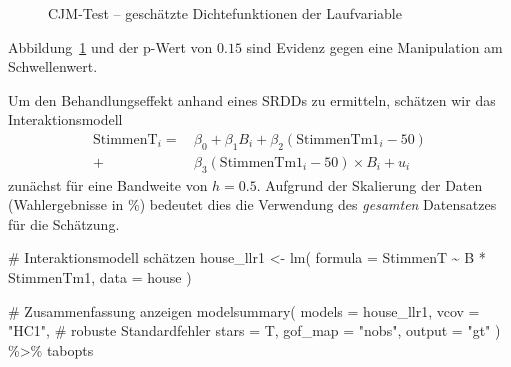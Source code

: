\documentclass[
  a4paper,
  DIV=11,
  oneside]{scrreprt}
\newenvironment{Shaded}{\begin{snugshade}}{\end{snugshade}}
\newcommand{\AttributeTok}[1]{\textcolor[rgb]{0.40,0.45,0.13}{#1}}
\newcommand{\CommentTok}[1]{\textcolor[rgb]{0.37,0.37,0.37}{#1}}
\newcommand{\FunctionTok}[1]{\textcolor[rgb]{0.28,0.35,0.67}{#1}}
\newcommand{\NormalTok}[1]{\textcolor[rgb]{0.00,0.23,0.31}{#1}}
\newcommand{\OtherTok}[1]{\textcolor[rgb]{0.00,0.23,0.31}{#1}}
\newcommand{\SpecialCharTok}[1]{\textcolor[rgb]{0.37,0.37,0.37}{#1}}
\newcommand{\StringTok}[1]{\textcolor[rgb]{0.13,0.47,0.30}{#1}}
\begin{document}
\begin{figure}[t]


\caption{\label{fig-cjm-lee}CJM-Test -- geschätzte Dichtefunktionen der
Laufvariable}

\end{figure}%

Abbildung~\ref{fig-cjm-lee} und der p-Wert von \(0.15\) sind Evidenz
gegen eine Manipulation am Schwellenwert.

Um den Behandlungseffekt anhand eines SRDDs zu ermitteln, schätzen wir
das Interaktionsmodell \begin{align*}
  \text{StimmenT}_i =&\, \beta_0 + \beta_1 B_i + \beta_2 (\text{StimmenTm1}_i - 50)\\ 
  +&\, \beta_3(\text{StimmenTm1}_i - 50)\times B_i + u_i
\end{align*} zunächst für eine Bandweite von \(h = 0.5\). Aufgrund der
Skalierung der Daten (Wahlergebnisse in \%) bedeutet dies die Verwendung
des \emph{gesamten} Datensatzes für die Schätzung.

\begin{Shaded}
\begin{Highlighting}[]
\CommentTok{\# Interaktionsmodell schätzen}
\NormalTok{house\_llr1 }\OtherTok{\textless{}{-}} \FunctionTok{lm}\NormalTok{(}
  \AttributeTok{formula =}\NormalTok{ StimmenT }\SpecialCharTok{\textasciitilde{}}\NormalTok{ B }\SpecialCharTok{*}\NormalTok{ StimmenTm1, }
  \AttributeTok{data =}\NormalTok{ house}
\NormalTok{)}

\CommentTok{\# Zusammenfassung anzeigen  }
\FunctionTok{modelsummary}\NormalTok{(}
  \AttributeTok{models =}\NormalTok{ house\_llr1, }
  \AttributeTok{vcov =} \StringTok{"HC1"}\NormalTok{, }\CommentTok{\# robuste Standardfehler}
  \AttributeTok{stars =}\NormalTok{ T, }
  \AttributeTok{gof\_map =} \StringTok{"nobs"}\NormalTok{, }
  \AttributeTok{output =} \StringTok{"gt"}
\NormalTok{) }\SpecialCharTok{\%\textgreater{}\%} 
\NormalTok{  tabopts}
\end{Highlighting}
\end{Shaded}
\end{document}
